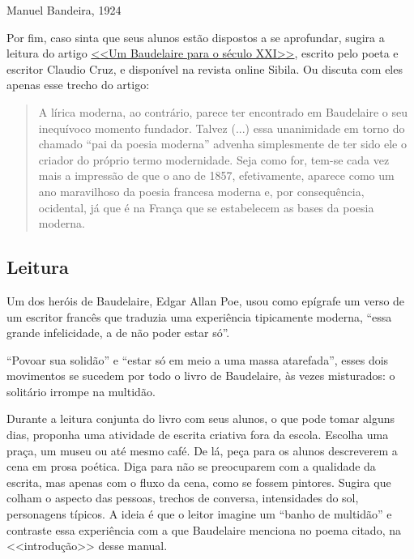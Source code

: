 \documentclass[12pt]{extarticle}
\begin{document}
\bigskip \hfill Manuel Bandeira, 1924

\pagebreak

Por fim, caso sinta que seus alunos estão dispostos a se aprofundar, 
sugira a leitura do artigo \href{http://sibila.com.br/novos-e-criticos/um-baudelaire-para-o-seculo-xxi/3579}{<<Um Baudelaire para o século XXI>>}, 
escrito pelo poeta e escritor Claudio Cruz, e disponível na 
revista online Sibila.
Ou discuta com eles apenas esse trecho do artigo:



\begin{quote}
A lírica moderna, ao contrário, parece ter encontrado em Baudelaire 
o seu inequívoco momento fundador. Talvez (...)
essa unanimidade em torno do chamado ``pai da poesia moderna'' advenha simplesmente 
de ter sido ele o criador do próprio termo modernidade. Seja como for, 
tem-se cada vez mais a impressão de que o ano de 1857, efetivamente, aparece como 
um ano maravilhoso da poesia francesa moderna e, por consequência, ocidental, já que 
é na França que se estabelecem as bases da poesia moderna.
\end{quote}

\subsection{Leitura}

Um dos heróis de Baudelaire, Edgar Allan Poe, usou como epígrafe um verso de 
um escritor francês que traduzia uma experiência tipicamente moderna, ``essa 
grande infelicidade, a de não poder estar só''.
 
``Povoar sua solidão'' e ``estar só em meio a uma massa atarefada'',  
esses dois movimentos se sucedem por todo o livro de Baudelaire, às vezes misturados:
o solitário irrompe na multidão.

Durante a leitura conjunta do livro com seus alunos, 
o que pode tomar alguns dias, proponha uma atividade de escrita criativa 
fora da escola. Escolha uma praça, um museu ou até mesmo café. De lá, peça para os 
alunos descreverem a cena em prosa poética. Diga para não se preocuparem com a qualidade
da escrita, mas apenas com o fluxo da cena, como se fossem pintores. Sugira que colham 
o aspecto das pessoas, trechos de conversa, intensidades do sol, personagens típicos.
A ideia é que o leitor imagine um ``banho de multidão'' e contraste essa experiência 
com a que Baudelaire menciona no poema citado, na <<introdução>> desse manual. 
\end{document}
